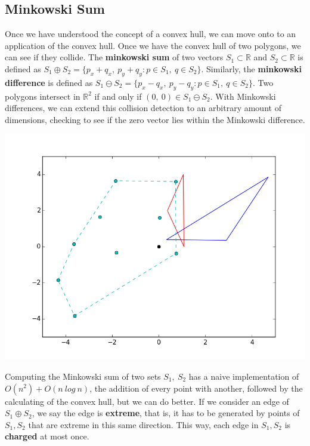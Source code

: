 \documentclass[10pt]{article}
\begin{document}
\begin{multicols}{2}
\subsection{Minkowski Sum}
\indent Once we have understood the concept of a convex hull, we can move onto to an application of the convex hull. Once we have the convex hull of two polygons, we can see if they collide. The \textbf{minkowski sum} of two vectors $S_1 \subset \mathbb{R}$ and $S_2 \subset \mathbb{R}$ is defined as $S_1 \oplus S_2 = \{p_x + q_x,\ p_y + q_y : p \in S_1,\ q \in S_2\}$. Similarly, the \textbf{minkowski difference} is defined as $S_1 \ominus S_2 = \{p_x - q_x,\ p_y - q_y : p \in S_1,\ q \in S_2\}$. Two polygons intersect in $\mathbb{R}^2$ if and only if $(0,\ 0) \in S_1 \ominus S_2$. With Minkowski differences, we can extend this collision detection to an arbitrary amount of dimensions, checking to see if the zero vector lies within the Minkowski difference.
\centerline{\includegraphics[scale=0.4]{minkowski_colliding.png}} 
\indent Computing the Minkowski sum of two sets $S_1,\ S_2$ has a naive implementation of $O(n^2) + O(n\ log\ n)$, the addition of every point with another, followed by the calculating of the convex hull, but we can do better. If we consider an edge of $S_1 \oplus S_2$, we say the edge is \textbf{extreme}, that is, it has to be generated by points of $S_1, S_2$ that are extreme in this same direction. This way, each edge in $S_1, S_2$ is \textbf{charged} at most once.

\end{multicols}
\end{document}
